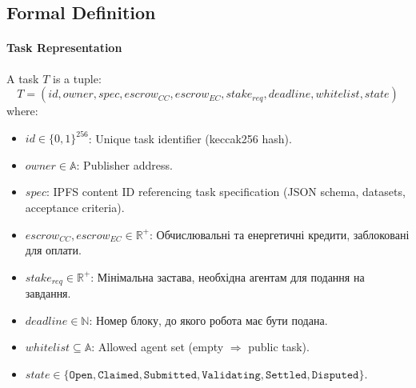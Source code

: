 \documentclass[11pt]{article}
\begin{document}
\subsection{Formal Definition}
\paragraph{Task Representation} A task $T$ is a tuple:
\begin{equation}
T = (id, owner, spec, escrow_{CC}, escrow_{EC}, stake_{req}, deadline, whitelist, state)
\end{equation}
where:
\begin{itemize}[noitemsep]
  \item $id \in \{0,1\}^{256}$: Unique task identifier (keccak256 hash).
  \item $owner \in \mathbb{A}$: Publisher address.
  \item $spec$: IPFS content ID referencing task specification (JSON schema, datasets, acceptance criteria).
  \item $escrow_{CC}, escrow_{EC} \in \mathbb{R}^+$: Обчислювальні та енергетичні кредити, заблоковані для оплати.
  \item $stake_{req} \in \mathbb{R}^+$: Мінімальна застава, необхідна агентам для подання на завдання.
  \item $deadline \in \mathbb{N}$: Номер блоку, до якого робота має бути подана.
  \item $whitelist \subseteq \mathbb{A}$: Allowed agent set (empty $\Rightarrow$ public task).
  \item $state \in \{\texttt{Open}, \texttt{Claimed}, \texttt{Submitted}, \texttt{Validating}, \texttt{Settled}, \texttt{Disputed}\}$.
\end{itemize}
\end{document}
